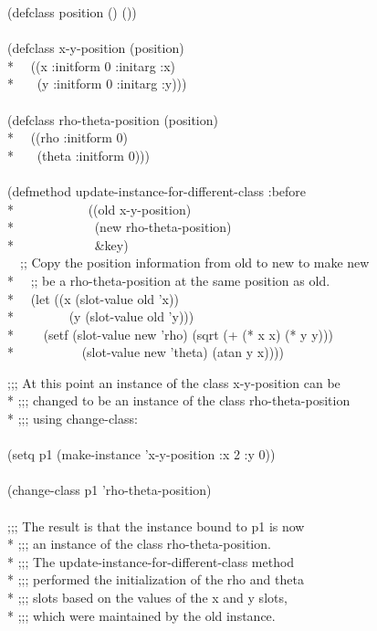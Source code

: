 \begin{defun}
\begin{lisp}
(defclass position () ()) \\
\\
(defclass x-y-position (position) \\*
~~((x :initform 0 :initarg :x) \\*
~~~(y :initform 0 :initarg :y))) \\
\\
(defclass rho-theta-position (position) \\*
~~((rho :initform 0) \\*
~~~(theta :initform 0))) \\
\\
(defmethod update-instance-for-different-class :before \\*
~~~~~~~~~~~((old x-y-position)  \\*
~~~~~~~~~~~~(new rho-theta-position) \\*
~~~~~~~~~~~~\&key) \\
~~;; Copy the position information from old to new to make new \\*
~~;; be a rho-theta-position at the same position as old. \\*
~~(let ((x (slot-value old 'x)) \\*
~~~~~~~~(y (slot-value old 'y))) \\*
~~~~(setf (slot-value new 'rho) (sqrt (+ (* x x) (* y y))) \\*
~~~~~~~~~~(slot-value new 'theta) (atan y x))))
\end{lisp}
\begin{lisp}
;;; At this point an instance of the class x-y-position can be \\*
;;; changed to be an instance of the class rho-theta-position \\*
;;; using change-class: \\
\\
(setq p1 (make-instance 'x-y-position :x 2 :y 0)) \\
\\
(change-class p1 'rho-theta-position) \\
\\
;;; The result is that the instance bound to p1 is now \\*
;;; an instance of the class rho-theta-position. \\*
;;; The update-instance-for-different-class method \\*
;;; performed the initialization of the rho and theta \\*
;;; slots based on the values of the x and y slots, \\*
;;; which were maintained by the old instance.
\end{lisp}


\end{defun}
